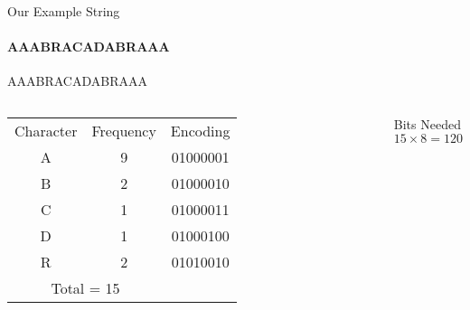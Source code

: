         
\begin{frame}{Our Example String}
\framesubtitle{AAABRACADABRAAA}
    \begin{block}{}
        \centering
            \Large{AAABRACADABRAAA}
    \end{block}
    \begin{center}
         \begin{columns}
\begin{table}[]
\begin{tabular}{ccc}
\rowcolor[HTML]{009901} 
Character                  & Frequency                 & Encoding \\
\rowcolor[HTML]{FE0000} 
A                          & 9                         & 01000001 \\
\rowcolor[HTML]{F8A102} 
B                          & 2                         & 01000010 \\
\rowcolor[HTML]{F8FF00} 
C                          & 1                         & 01000011 \\
\rowcolor[HTML]{FCFF2F} 
D                          & 1                         & 01000100 \\
\rowcolor[HTML]{FFCC67} 
R                          & 2                         & 01010010 \\
\multicolumn{2}{c}{\cellcolor[HTML]{FFFFFF}Total = 15} &         
\end{tabular}
\end{table}
    \pause 
    \begin{exampleblock}{\centering Bits Needed}
    \centering $$15 \times 8 = 120$$
    \end{exampleblock}
    \end{columns}\\
        
    \end{center}
\end{frame}

